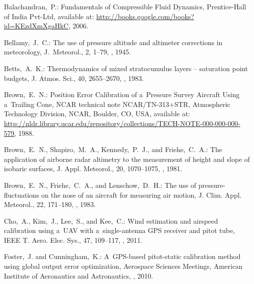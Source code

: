 \documentclass[amtd, online, hvmath]{copernicus}
\begin{document}
\begin{thebibliography}{30}

Balachandran,~P.: {Fundamentals of Compressible Fluid Dynamics},
Prentice-Hall of India Pvt-Ltd, available at: \url{http://books.google.com/books?id=KEzdXmXgaHkC}, 2006.


Bellamy,~J.~C.: {The use of pressure altitude and altimeter corrections in meteorology},
{J.~Meteorol.}, 2, 1--79, , 1945.


Betts,~A.~K.: {Thermodynamics of mixed stratocumulus layers -- saturation point budgets},
{J. Atmos. Sci.}, {40}, {2655--2670}, , {1983}.


Brown,~E.~N.: Position Error Calibration of a~Pressure Survey Aircraft
Using a~Trailing Cone, NCAR technical note NCAR/TN-313+STR,
Atmospheric Technology Division, NCAR, Boulder, CO, USA, available at:
\url{http://nldr.library.ucar.edu/repository/collections/TECH-NOTE-000-000-000-579}, 1988.


Brown,~E.~N., Shapiro,~M.~A., Kennedy,~P.~J., and Friehe,~C.~A.: {The application
of airborne radar altimetry to the measurement of height and slope of isobaric surfaces},
{J. Appl. Meteorol.}, {20}, {1070--1075}, , {1981}.


Brown,~E.~N., Friehe,~C.~A., and Lenschow,~D.~H.: {The use of pressure-fluctuations
on the nose of an aircraft for measuring air motion}, {J. Clim. Appl. Meteorol.},
{22}, {171--180}, , {1983}.


Cho,~A., Kim,~J., Lee,~S., and Kee,~C.: {Wind estimation and airspeed calibration
using a~UAV with a~single-antenna GPS receiver and pitot tube}, {IEEE T. Aero. Elec. Sys.}, {47}, {109--117}, , {2011}.


Foster,~J. and Cunningham,~K.: {A~GPS-based pitot-static calibration
  method using global output error optimization}, {Aerospace Sciences
  Meetings}, American Institute of Aeronautics and Astronautics,
, 2010.



\end{thebibliography}
\end{document}
